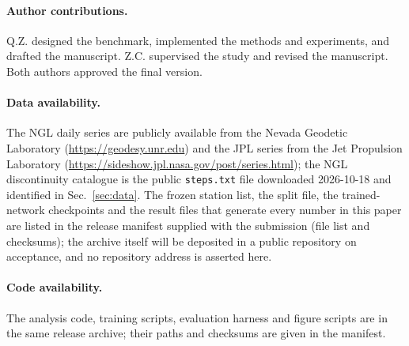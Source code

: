 \documentclass[smallextended]{svjour3}
\begin{document}
\paragraph{Author contributions.}
Q.Z. designed the benchmark, implemented the methods and experiments, and
drafted the manuscript. Z.C. supervised the study and revised the manuscript.
Both authors approved the final version.

\paragraph{Data availability.}
The NGL daily series are publicly available from the Nevada Geodetic Laboratory
(\url{https://geodesy.unr.edu}) and the JPL series from the Jet Propulsion
Laboratory (\url{https://sideshow.jpl.nasa.gov/post/series.html}); the NGL
discontinuity catalogue is the public \texttt{steps.txt} file downloaded
2026-10-18 and identified in Sec.~\ref{sec:data}. The frozen station list, the
split file, the trained-network checkpoints and the result files that generate
every number in this paper are listed in the release manifest supplied with the
submission (file list and checksums); the archive itself will be deposited in a
public repository on acceptance, and no repository address is asserted here.

\paragraph{Code availability.}
The analysis code, training scripts, evaluation harness and figure scripts are
in the same release archive; their paths and checksums are given in the
manifest.

\clearpage


\end{document}
